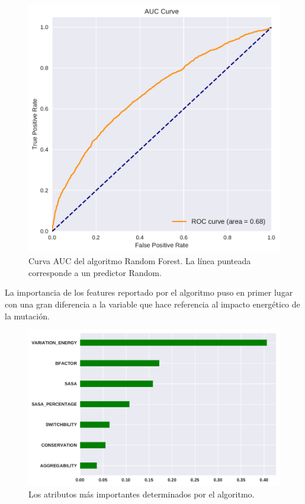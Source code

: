 \begin{figure}[h]
    \centering
    \includegraphics[scale=0.6]{documents/latex/figures/3/auc_varq.pdf}
    \caption{Curva AUC del algoritmo Random Forest. La línea punteada corresponde a un predictor Random.}
    \label{fig:auc_varq}
\end{figure}

La importancia de los features reportado por el algoritmo puso en primer lugar con una gran diferencia a la variable que hace referencia al impacto energético de la mutación.  


\begin{figure}[H]
    \centering
    \includegraphics[scale=0.73]{documents/latex/figures/3/importances_varq.pdf}
    \caption{Los atributos más importantes determinados por el algoritmo.}
    \label{fig:importance_varq}
\end{figure}


